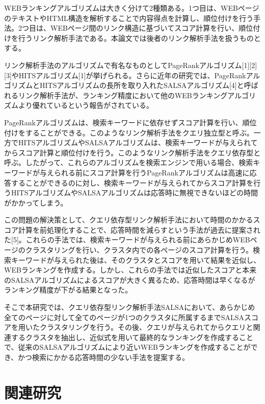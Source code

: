 \documentclass[a4paper,11pt]{jreport}
\begin{document}
WEBランキングアルゴリズムは大きく分けて2種類ある。1つ目は、WEBページのテキストやHTML構造を解析することで内容得点を計算し、順位付けを行う手法。2つ目は、WEBページ間のリンク構造に基づいてスコア計算を行い、順位付けを行うリンク解析手法である。本論文では後者のリンク解析手法を扱うものとする。

リンク解析手法のアルゴリズムで有名なものとしてPageRankアルゴリズム[1][2][3]やHITSアルゴリズム[1]が挙げられる。さらに近年の研究では、PageRankアルゴリズムとHITSアルゴリズムの長所を取り入れたSALSAアルゴリズム[4]と呼ばれるリンク解析手法が、ランキング精度において他のWEBランキングアルゴリズムより優れているという報告がされている。

PageRankアルゴリズムは、検索キーワードに依存せずスコア計算を行い、順位付けをすることができる。このようなリンク解析手法をクエリ独立型と呼ぶ。一方でHITSアルゴリズムやSALSAアルゴリズムは、検索キーワードが与えられてからスコア計算と順位付けを行う。このようなリンク解析手法をクエリ依存型と呼ぶ。したがって、これらのアルゴリズムを検索エンジンで用いる場合、検索キーワードが与えられる前にスコア計算を行うPageRankアルゴリズムは高速に応答することができるのに対し、検索キーワードが与えられてからスコア計算を行うHITSアルゴリズムやSALSAアルゴリズムは応答時に無視できないほどの時間がかかってしまう。

この問題の解決策として、クエリ依存型リンク解析手法において時間のかかるスコア計算を前処理化することで、応答時間を減らすという手法が過去に提案された[5]。これらの手法では、検索キーワードが与えられる前にあらかじめWEBページのクラスタリングを行い、クラスタ内での各ページのスコア計算を行う。検索キーワードが与えられた後は、そのクラスタとスコアを用いて結果を近似し、WEBランキングを作成する。しかし、これらの手法では近似したスコアと本来のSALSAアルゴリズムによるスコアが大きく異るため、応答時間は早くなるがランキング精度が下がる結果となった。

そこで本研究では、クエリ依存型リンク解析手法SALSAにおいて、あらかじめ全てのページに対して全てのページが1つのクラスタに所属するまでSALSAスコアを用いたクラスタリングを行う。その後、クエリが与えられてからクエリと関連するクラスタを抽出し、近似式を用いて最終的なランキングを作成することで、従来のSALSAアルゴリズムにより近いWEBランキングを作成することができ、かつ検索にかかる応答時間の少ない手法を提案する。


\chapter{関連研究}
\end{document}
